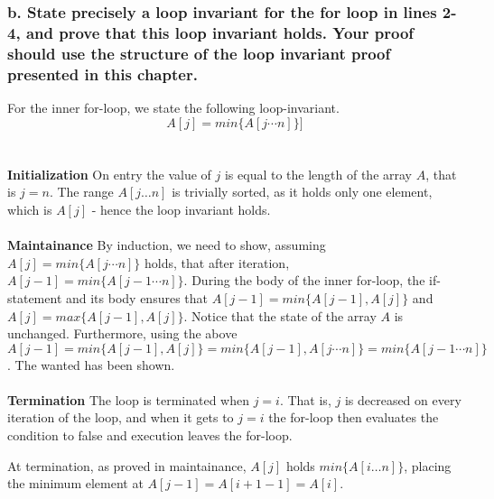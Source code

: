 \documentclass[11pt,english]{article}
\begin{document}
\subsubsection*{\large b. \mdseries State precisely a loop invariant for the
\textbf{for} loop in lines 2-4, and prove that this loop invariant holds. Your
proof should use the structure of the loop invariant proof presented in this
chapter.}
For the inner for-loop, we state the following loop-invariant.
\begin{equation}
A[j] = min\{A[j \cdots n]\}]
\end{equation}
\\\\
\textbf{Initialization} \mdseries On entry the value of $j$ is equal to the
length of the array $A$, that is $j = n$. The range $A[j \dots n]$ is
trivially sorted, as it holds only one element, which is $A[j]$ - hence the
loop invariant holds.
\\\\
\textbf{Maintainance} \mdseries By induction, we need to show, assuming $A[j]
= min\{A[j \cdots n]\}$ holds, that after iteration, $A[j-1] = min\{
A[j-1 \cdots n]\}$. During the body of the inner for-loop, the
if-statement and its body ensures that $A[j-1] = min\{A[j-1],A[j]\}$ and
$A[j] = max\{A[j-1],A[j]\}$. Notice that the state of the array $A$ is
unchanged. Furthermore, using the above $A[j-1] = min\{A[j-1],A[j]\}
= min\{A[j-1], A[j \cdots n]\} = min\{A[j-1 \cdots n]\}$.
The wanted has been shown.
\\\\
\textbf{Termination} \mdseries The loop is terminated when $j = i$. That is,
$j$ is decreased on every iteration of the loop, and when it gets to
$j = i$ the for-loop then evaluates the condition to false and execution
leaves the for-loop.

At termination, as proved in maintainance, $A[j]$ holds $min\{A[i \dots n]\}$,
placing the minimum element at $A[j - 1] = A[i + 1 - 1] = A[i]$.
\end{document}
